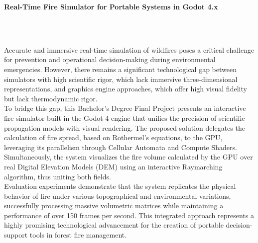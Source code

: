 \cleardoublepage

\thispagestyle{empty}


\begin{center}
{\large\bfseries Real-Time Fire Simulator for Portable Systems in Godot 4.x}\\
\end{center}
\begin{center}
\myName\\
\end{center}


\vspace{0.7cm}
\\
Accurate and immersive real-time simulation of wildfires poses a critical challenge for prevention and operational decision-making during environmental emergencies. However, there remains a significant technological gap between simulators with high scientific rigor, which lack immersive three-dimensional representations, and graphics engine approaches, which offer high visual fidelity but lack thermodynamic rigor.\\

To bridge this gap, this Bachelor's Degree Final Project presents an interactive fire simulator built in the Godot 4 engine that unifies the precision of scientific propagation models with visual rendering. The proposed solution delegates the calculation of fire spread, based on Rothermel's equations, to the GPU, leveraging its parallelism through Cellular Automata and Compute Shaders. Simultaneously, the system visualizes the fire volume calculated by the GPU over real Digital Elevation Models (DEM) using an interactive Raymarching algorithm, thus uniting both fields.\\

Evaluation experiments demonstrate that the system replicates the physical behavior of fire under various topographical and environmental variations, successfully processing massive volumetric matrices while maintaining a performance of over 150 frames per second. This integrated approach represents a highly promising technological advancement for the creation of portable decision-support tools in forest fire management.\\

\cleardoublepage


